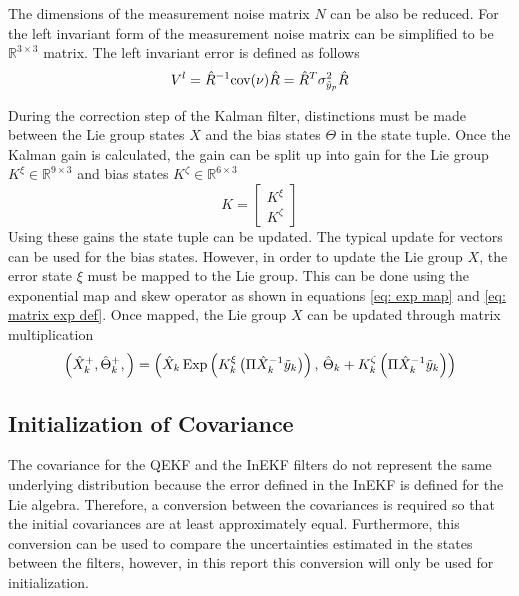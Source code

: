 The dimensions of the measurement noise matrix $N$ can be also be reduced. For the left invariant form of the measurement noise matrix can be simplified to be $\mathbb{R}^{3 \times 3}$ matrix. The left invariant error is defined as follows \cite{Contact-Aided_Invarant_EKF}
\begin{equation}
    V^l = \hat{R}^{-1} \mathrm{cov}(\nu) \hat{R} = \hat{R}^T \sigma_{\Tilde{y}_p}^2 \hat{R}
\end{equation}

During the correction step of the Kalman filter, distinctions must be made between the Lie group states $X$ and the bias states $\Theta$ in the state tuple. Once the Kalman gain is calculated, the gain can be split up into gain for the Lie group $K^{\xi} \in \mathbb{R}^{9 \times 3}$ and bias states $K^{\zeta} \in \mathbb{R}^{6 \times 3}$
\begin{equation}
    K = \begin{bmatrix}
        K^{\xi} \\
        K^{\zeta}
    \end{bmatrix}
    \label{eq: Kalman gain for LInEKF}
\end{equation}
Using these gains the state tuple can be updated. The typical update for vectors can be used for the bias states. However, in order to update the Lie group $X$, the error state $\xi$ must be mapped to the Lie group. This can be done using the exponential map and skew operator as shown in equations \eqref{eq: exp map} and \eqref{eq: matrix exp def}. Once mapped, the Lie group $X$ can be updated through matrix multiplication
\begin{equation}
    \left( \hat{X}_k^+, \hat{\Theta}_k^+, \right) = 
    \left( \hat{X}_k \, \text{Exp} \left( K^{\xi}_k \, \big(\Pi \hat{X}_k^{-1} \Tilde{y}_k \big) \right), 
    \, \hat{\Theta}_k + K_k^{\zeta} \left( \Pi \hat{X}_k^{-1} \Tilde{y}_k \right) \right)
    \label{eq: state tuple correction update}
\end{equation}

\subsection{Initialization of Covariance}
The covariance for the QEKF and the InEKF filters do not represent the same underlying distribution because the error defined in the InEKF is defined for the Lie algebra. Therefore, a conversion between the covariances is required so that the initial covariances are at least approximately equal. Furthermore, this conversion can be used to compare the uncertainties estimated in the states between the filters, however, in this report this conversion will only be used for initialization.

